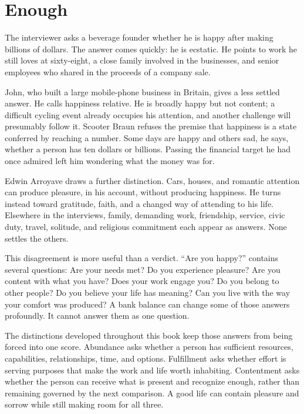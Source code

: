 \chapter{Enough}

The interviewer asks a beverage founder whether he is happy after making
billions of dollars. The answer comes quickly: he is ecstatic. He points to
work he still loves at sixty-eight, a close family involved in the businesses,
and senior employees who shared in the proceeds of a company sale.

John, who built a large mobile-phone business in Britain, gives a less settled
answer. He calls happiness relative. He is broadly happy but not content; a
difficult cycling event already occupies his attention, and another challenge
will presumably follow it. Scooter Braun refuses the premise that happiness is
a state conferred by reaching a number. Some days are happy and others sad, he
says, whether a person has ten dollars or billions. Passing the financial
target he had once admired left him wondering what the money was for.

Edwin Arroyave draws a further distinction. Cars, houses, and romantic
attention can produce pleasure, in his account, without producing happiness.
He turns instead toward gratitude, faith, and a changed way of attending to
his life. Elsewhere in the interviews, family, demanding work, friendship,
service, civic duty, travel, solitude, and religious commitment each appear as
answers. None settles the others.

This disagreement is more useful than a verdict. ``Are you happy?'' contains
several questions: Are your needs met? Do you experience pleasure? Are you
content with what you have? Does your work engage you? Do you belong to other
people? Do you believe your life has meaning? Can you live with the way your
comfort was produced? A bank balance can change some of those answers
profoundly. It cannot answer them as one question.

The distinctions developed throughout this book keep those answers from being
forced into one score. Abundance asks whether a person has sufficient
resources, capabilities, relationships, time, and options. Fulfillment asks
whether effort is serving purposes that make the work and life worth
inhabiting. Contentment asks whether the person can receive what is present and
recognize enough, rather than remaining governed by the next comparison. A
good life can contain pleasure and sorrow while still making room for all
three.

